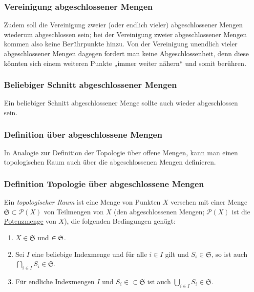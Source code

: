 \documentclass[12pt,]{article}
\providecommand{\tightlist}{%
  \setlength{\itemsep}{0pt}\setlength{\parskip}{0pt}}
\begin{document}
\subsubsection{Vereinigung abgeschlossener
Mengen}\label{vereinigung-abgeschlossener-mengen}

Zudem soll die Vereinigung zweier (oder endlich vieler) abgeschlossener
Mengen wiederum abgeschlossen sein; bei der Vereinigung zweier
abgeschlossener Mengen kommen also keine Berührpunkte hinzu. Von der
Vereinigung unendlich vieler abgeschlossener Mengen dagegen fordert man
keine Abgeschlossenheit, denn diese könnten sich einem weiteren Punkte
„immer weiter nähern`` und somit berühren.

\subsubsection{Beliebiger Schnitt abgeschlossener
Mengen}\label{beliebiger-schnitt-abgeschlossener-mengen}

Ein beliebiger Schnitt abgeschlossener Menge sollte auch wieder
abgeschlossen sein.

\subsubsection{Definition über abgeschlossene
Mengen}\label{definition-uxfcber-abgeschlossene-mengen}

In Analogie zur Definition der Topologie über offene Mengen, kann man
einen topologischen Raum auch über die abgeschlossenen Mengen
definieren.

\subsubsection{Definition Topologie über abgeschlossene
Mengen}\label{definition-topologie-uxfcber-abgeschlossene-mengen}

Ein \emph{topologischer Raum} ist eine Menge von Punkten \(X\) versehen
mit einer Menge \(\mathfrak{S} \subset \mathcal{P}\left(X\right)\) von
Teilmengen von \(X\) (den abgeschlossenen Mengen;
\(\mathcal{P}\left(X\right)\) ist die \url{Potenzmenge} von \(X\)), die
folgenden Bedingungen genügt:

\begin{enumerate}
\tightlist
\item
  \(X \in \mathfrak{S}\) und \(\empty \in \mathfrak{S}\).
\item
  Sei \(I\) eine beliebige Indexmenge und für alle \(i \in I\) gilt und
  \(S_i \in \mathfrak{S}\), so ist auch
  \(\displaystyle\bigcap_{i \in I} S_i \in \mathfrak{S}\).
\item
  Für endliche Indexmengen \(I\) und \(S_i \in \subset \mathfrak{S}\)
  ist auch \(\displaystyle\bigcup_{i \in I} S_i \in \mathfrak{S}\).
\end{enumerate}
\end{document}
